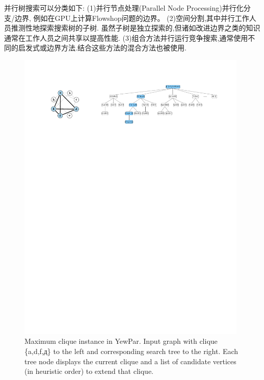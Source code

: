 \documentclass{mproj}
\begin{document}
并行树搜索可以分类\cite{gendron1994parallel}如下:
(1)并行节点处理(Parallel Node Processing)并行化分支/边界,
例如在GPU上计算Flowshop问题的边界\cite{gmys2016work}。
(2)空间分割,其中并行工作人员推测性地探索搜索树的子树.
虽然子树是独立探索的,但诸如改进边界之类的知识通常在工作人员之间共享以提高性能.
(3)组合方法并行运行竞争搜索,通常使用不同的启发式或边界方法.结合这些方法的混合方法也被使用.

\begin{figure}[h]
    \centering %
    \includegraphics[width=0.98\textwidth]{images/yewpar_maxclique.pdf} %
    \caption{Maximum clique instance in YewPar. Input graph with clique \{a,d,f,д\} to the left and corresponding search tree to the right.
        Each tree node displays the current clique and a list of candidate vertices (in heuristic order) to extend that clique.\cite{10.1145/3332466.3374537}} %
    \label{fig:yewpar_maxclique} %
\end{figure}
\FloatBarrier
\end{document}
